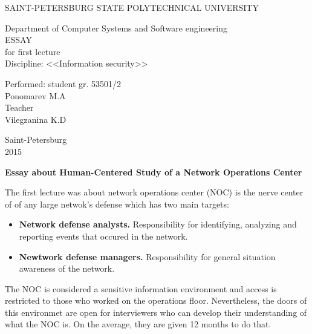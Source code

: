 \documentclass[10pt,a4paper]{article}
\begin{document}
\begin{center} 

\large SAINT-PETERSBURG STATE POLYTECHNICAL UNIVERSITY

\large Department of Computer Systems and Software engineering \\[8.5cm] 

\huge ESSAY \\[0.6cm] %
\large for first lecture\\
\large Discipline: <<Information security>>\\[4.5cm]

\end{center} 

\begin{flushright}
Performed: student gr. 53501/2 \\
Ponomarev M.A \\[1.0cm]


Teacher \\
Vilegzanina K.D
\end{flushright}


\vfill 

\begin{center} 
\large Saint-Petersburg \\
2015
\end{center} 

\thispagestyle{empty}

\newpage


\begin{center}
\huge \textbf{Essay about Human-Centered Study of a Network Operations Center
}
\end{center}
\bigskip

The first lecture was about network operations center (NOC) is the nerve center of of any large netwok's defense which has two main targets:

\begin{itemize}
	\item \textbf{Network defense analysts.} Responsibility for identifying, analyzing and reporting events that occured in the network.
	\item \textbf{Newtwork defense managers.} Responsibility for general situation awareness of the network.
\end{itemize}

The NOC is considered a sensitive information environment and access is restricted to those who worked on the operations floor. Nevertheless, the doors of this environmet are open for interviewers who can develop their understanding of what the NOC is. On the average, they are given 12 months to do that.
\end{document}
